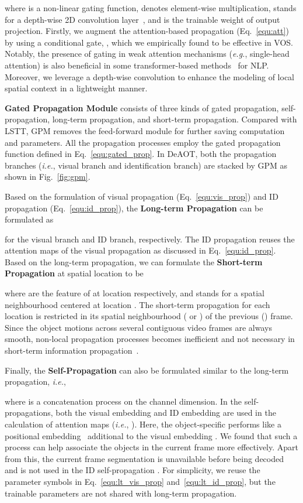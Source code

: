 \documentclass{article}
\def\eg{\emph{e.g.}}
\def\ie{\emph{i.e.}}
\begin{document}
where  is a non-linear gating function,  denotes element-wise multiplication,  stands for a depth-wise 2D convolution layer~\cite{xception}, and  is the trainable weight of output projection. Firstly, we augment the attention-based propagation (Eq.~\ref{equ:att}) by using a conditional gate, , which we empirically found to be effective in VOS. Notably, the presence
of gating in weak attention mechanisms (\eg, single-head attention) is also beneficial in some transformer-based methods~\cite{liu2021pay,gau} for NLP. Moreover, we leverage a depth-wise convolution  to enhance the modeling of local spatial context in a lightweight manner.

\noindent\textbf{Gated Propagation Module} consists of three kinds of gated propagation, self-propagation, long-term propagation, and short-term propagation. Compared with LSTT, GPM removes the feed-forward module for further saving computation and parameters. All the propagation processes employ the gated propagation function defined in Eq.~\ref{equ:gated_prop}. In DeAOT, both the propagation branches (\ie, visual branch and identification branch) are stacked by GPM as shown in Fig.~\ref{fig:gpm}. 

Based on the formulation of visual propagation (Eq.~\ref{equ:vis_prop}) and ID propagation (Eq.~\ref{equ:id_prop}), the \textbf{Long-term Propagation} can be formulated as


for the visual branch and ID branch, respectively. The ID propagation reuses the attention maps of the visual propagation as discussed in Eq.~\ref{equ:id_prop}. Based on the long-term propagation, we can formulate the \textbf{Short-term Propagation} at spatial location  to be


where  are the feature of  at location  respectively, and  stands for a  spatial neighbourhood centered at location . The short-term propagation for each location  is restricted in its spatial neighbourhood ( or ) of the previous () frame. Since the object motions across several contiguous video frames are always smooth, non-local propagation processes becomes inefficient and not necessary in short-term information propagation~\cite{cfbi}.

Finally, the \textbf{Self-Propagation} can also be formulated similar to the long-term propagation, \ie,


where  is a concatenation process on the channel dimension. In the self-propagations, both the visual embedding  and ID embedding  are used in the calculation of attention maps (\ie, ). Here, the object-specific  performs like a positional embedding~\cite{transformer} additional to the visual embedding . We found that such a process can help associate the objects in the current frame more effectively. Apart from this, the current frame segmentation  is unavailable before being decoded and is not used in the ID self-propagation . For simplicity, we reuse the parameter symbols in Eq.~\ref{equ:lt_vis_prop} and~\ref{equ:lt_id_prop}, but the trainable parameters are not shared with long-term propagation.
\end{document}
